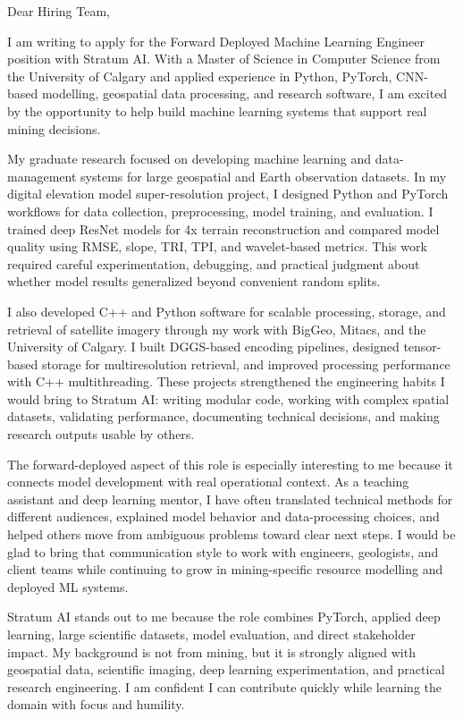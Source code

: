 \documentclass[11pt]{letter}
\begin{document}
\begin{letter}{}

\opening{Dear Hiring Team,}

I am writing to apply for the Forward Deployed Machine Learning Engineer position with Stratum AI. With a Master of Science in Computer Science from the University of Calgary and applied experience in Python, PyTorch, CNN-based modelling, geospatial data processing, and research software, I am excited by the opportunity to help build machine learning systems that support real mining decisions.

My graduate research focused on developing machine learning and data-management systems for large geospatial and Earth observation datasets. In my digital elevation model super-resolution project, I designed Python and PyTorch workflows for data collection, preprocessing, model training, and evaluation. I trained deep ResNet models for 4x terrain reconstruction and compared model quality using RMSE, slope, TRI, TPI, and wavelet-based metrics. This work required careful experimentation, debugging, and practical judgment about whether model results generalized beyond convenient random splits.

I also developed C++ and Python software for scalable processing, storage, and retrieval of satellite imagery through my work with BigGeo, Mitacs, and the University of Calgary. I built DGGS-based encoding pipelines, designed tensor-based storage for multiresolution retrieval, and improved processing performance with C++ multithreading. These projects strengthened the engineering habits I would bring to Stratum AI: writing modular code, working with complex spatial datasets, validating performance, documenting technical decisions, and making research outputs usable by others.

The forward-deployed aspect of this role is especially interesting to me because it connects model development with real operational context. As a teaching assistant and deep learning mentor, I have often translated technical methods for different audiences, explained model behavior and data-processing choices, and helped others move from ambiguous problems toward clear next steps. I would be glad to bring that communication style to work with engineers, geologists, and client teams while continuing to grow in mining-specific resource modelling and deployed ML systems.

Stratum AI stands out to me because the role combines PyTorch, applied deep learning, large scientific datasets, model evaluation, and direct stakeholder impact. My background is not from mining, but it is strongly aligned with geospatial data, scientific imaging, deep learning experimentation, and practical research engineering. I am confident I can contribute quickly while learning the domain with focus and humility.


\end{letter}
\end{document}
